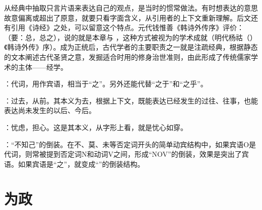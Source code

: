 {\begin{lyblobitemize}
从经典中抽取只言片语来表达自己的观点，是当时的惯常做法。有时想表达的意思故意偏离或超出了原意，就要只看字面含义，从引用者的上下文重新理解。后文还有引用《诗经》之处，可以留意这个特点。元代钱惟善《韩诗外传序》评价：（要：总，总之），说的就是本章与 ，这种方式被视为的学术成就（明代杨祜（）《韩诗外传》序）。成为正统后，古代学者的主要职责之一就是注疏经典，根据静态的文本阐述古代圣贤之意，发掘适合时用的修身治世准则，由此形成了传统儒家学术的主体——经学。

\item {}：代词，用作宾语，相当于“之”。另外还能代替“之于”和“之乎”。
\item {}：过去，从前。其本义为去，根据上下文，既能表达已经发生的过往、往事，也能表达尚未发生的以后、今后。
\end{lyblobitemize}
}
{}


{
\item {}：忧虑，担心。这是其本义，从字形上看，就是忧心如穿。
\item {}：“不知己”的倒装。在不、莫、未等否定词开头的简单动宾结构中，如果宾语O是代词，则常被提到否定词N和动词V之间，形成“NOV”的倒装，效果是突出了宾语。如果宾语是“之”，就变成“”的倒装结构。
}
{}


\chapter{为政}

